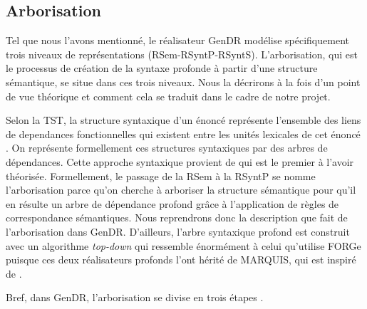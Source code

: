 
\subsection{Arborisation}\label{sec:arbo}

Tel que nous l'avons mentionné, le réalisateur GenDR modélise spécifiquement trois niveaux de représentations (\ac{RSem}-\ac{RSyntP}-\ac{RSyntS}). L'arborisation, qui est le processus de création de la syntaxe profonde à partir d'une structure sémantique, se situe dans ces trois niveaux. Nous la décrirons à la fois d'un point de vue théorique et comment cela se traduit dans le cadre de notre projet.

Selon la \ac{TST}, la structure syntaxique d'un énoncé représente l'ensemble des liens de dependances fonctionnelles qui existent entre les unités lexicales de cet énoncé \citep{melcuk1988}. On représente formellement ces structures syntaxiques par des arbres de dépendances. Cette approche syntaxique provient de \cite{TesniereElementssyntaxestructurale1965} qui est le premier à l'avoir théorisée. Formellement, le passage de la \ac{RSem} à la \ac{RSyntP} se nomme l'arborisation parce qu'on cherche à arboriser la structure sémantique pour qu'il en résulte un arbre de dépendance profond grâce à l'application de règles de correspondance sémantiques. Nous reprendrons donc la description que \cite{lareau18} fait de l'arborisation dans GenDR. D'ailleurs, l'arbre syntaxique profond est construit avec un algorithme \emph{top-down} qui ressemble énormément à celui qu'utilise FORGe puisque ces deux réalisateurs profonds l'ont hérité de MARQUIS, qui est inspiré de \cite{PolguereStructurationmisejeu1990}.

Bref, dans GenDR, l'arborisation se divise en trois étapes \citep{lareau18}.

